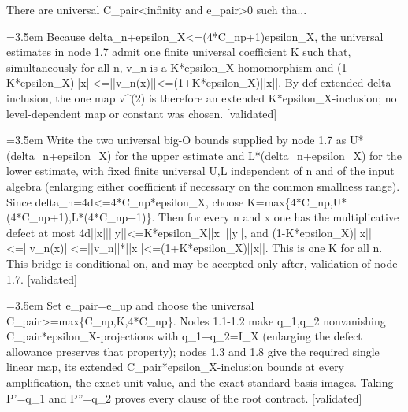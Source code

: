 \documentclass{article}
\newcommand{\step}[1]{\par\noindent\hangindent=3.5em\hangafter=1%
  \makebox[3.5em][l]{\textbf{#1.}}}
\newcommand{\steptag}[1]{\hfill{\small\textsf{[#1]}}}
\begin{document}
\begin{proofbox}{There are universal C\_pair<infinity and e\_pair>0 such tha...}
\step{1.8} Because delta\_n+epsilon\_X<=(4*C\_np+1)epsilon\_X, the universal estimates in node 1.7 admit one finite universal coefficient K such that, simultaneously for all n, v\_n is a K*epsilon\_X-homomorphism and (1-K*epsilon\_X)||x||<=||v\_n(x)||<=(1+K*epsilon\_X)||x||. By def-extended-delta-inclusion, the one map v\textasciicircum{}(2) is therefore an extended K*epsilon\_X-inclusion; no level-dependent map or constant was chosen. \steptag{validated} \\[6pt]
\step{1.8.1} Write the two universal big-O bounds supplied by node 1.7 as U*(delta\_n+epsilon\_X) for the upper estimate and L*(delta\_n+epsilon\_X) for the lower estimate, with fixed finite universal U,L independent of n and of the input algebra (enlarging either coefficient if necessary on the common smallness range). Since delta\_n=4d<=4*C\_np*epsilon\_X, choose K=max\{4*C\_np,U*(4*C\_np+1),L*(4*C\_np+1)\}. Then for every n and x one has the multiplicative defect at most 4d||x||||y||<=K*epsilon\_X||x||||y||, and (1-K*epsilon\_X)||x||<=||v\_n(x)||<=||v\_n||*||x||<=(1+K*epsilon\_X)||x||. This is one K for all n. This bridge is conditional on, and may be accepted only after, validation of node 1.7. \steptag{validated} \\[4pt]
\step{1.9} Set e\_pair=e\_up and choose the universal C\_pair>=max\{C\_np,K,4*C\_np\}. Nodes 1.1-1.2 make q\_1,q\_2 nonvanishing C\_pair*epsilon\_X-projections with q\_1+q\_2=I\_X (enlarging the defect allowance preserves that property); nodes 1.3 and 1.8 give the required single linear map, its extended C\_pair*epsilon\_X-inclusion bounds at every amplification, the exact unit value, and the exact standard-basis images. Taking P'=q\_1 and P''=q\_2 proves every clause of the root contract. \steptag{validated} \\[4pt]
\end{proofbox}
\end{document}
